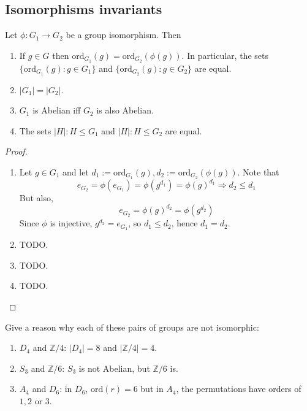 \subsection{Isomorphisms invariants}

\begin{lemma}
	Let $\phi: G_1 \rightarrow G_2$ be a group isomorphism. Then
	\begin{enumerate}
		\item If $g \in G$ then $\text{ord}_{G_1}(g) = \text{ord}_{G_2}(\phi(g))$. In particular, the sets $\{ \text{ord}_{G_1}(g): g \in G_1 \}$ and $\{ \text{ord}_{G_2}(g): g \in G_2 \}$ are equal.
		\item $|G_1| = |G_2|$.
		\item $G_1$ is Abelian iff $G_2$ is also Abelian.
		\item The sets $|H|: H \le G_1$ and $|H|: H \le G_2$ are equal.
	\end{enumerate}
\end{lemma}

\begin{proof}
	\hfill
	\begin{enumerate}
		\item Let $g \in G_1$ and let $d_1 := \text{ord}_{G_1}(g), d_2 := \text{ord}_{G_2}(\phi(g))$. Note that
		\[
			e_{G_2} = \phi(e_{G_1}) = \phi(g^{d_1}) = \phi(g)^{d_1} \Longrightarrow d_2 \le d_1
		\]
		But also,
		\[
			e_{G_2} = \phi(g)^{d_2} = \phi(g^{d_2})
		\]
		Since $\phi$ is injective, $g^{d_2} = e_{G_1}$, so $d_1 \le d_2$, hence $d_1 = d_2$.
		\item TODO.
		\item TODO.
		\item TODO.
	\end{enumerate}
\end{proof}

\begin{example}
	Give a reason why each of these pairs of groups are not isomorphic:
	\begin{enumerate}
		\item $D_4$ and $\mathbb{Z} / 4$: $|D_4| = 8$ and $|\mathbb{Z} / 4| = 4$.
		\item $S_3$ and $\mathbb{Z} / 6$: $S_3$ is not Abelian, but $\mathbb{Z} / 6$ is.
		\item $A_4$ and $D_6$: in $D_6$, $\text{ord}(r) = 6$ but in $A_4$, the permutations have orders of $1, 2$ or $3$.
	\end{enumerate}
\end{example}

